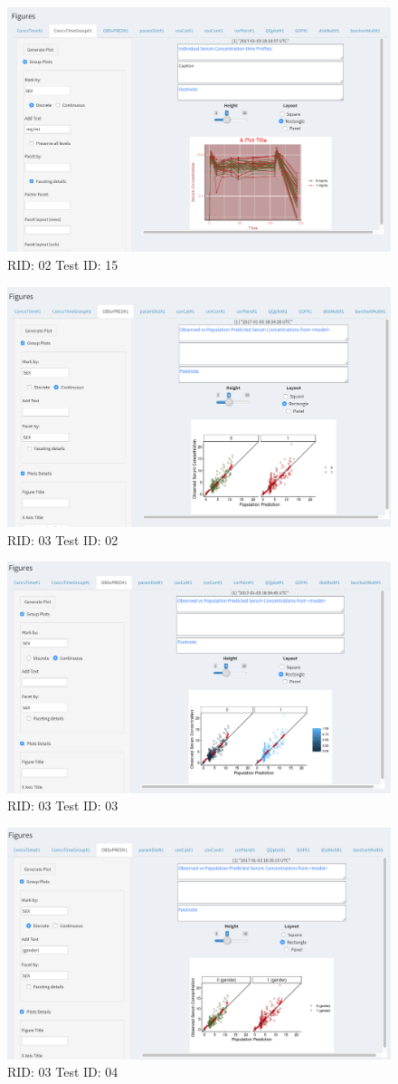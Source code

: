 \begin{figure}[H]
\includegraphics[width=.8\textwidth]{screencaps/02-15-1.png}
\caption{RID: 02 Test ID: 15}
\end{figure}
\begin{figure}[H]
\includegraphics[width=.8\textwidth]{screencaps/03-02-1.png}
\caption{RID: 03 Test ID: 02}
\end{figure}
\begin{figure}[H]
\includegraphics[width=.8\textwidth]{screencaps/03-03-1.png}
\caption{RID: 03 Test ID: 03}
\end{figure}
\begin{figure}[H]
\includegraphics[width=.8\textwidth]{screencaps/03-04-1.png}
\caption{RID: 03 Test ID: 04}
\end{figure}
